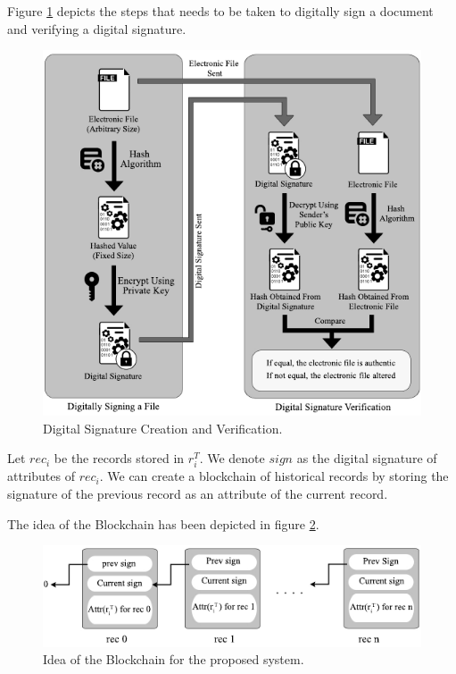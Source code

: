 		Figure \ref{fig:DigitalSignature} depicts the steps that needs to be taken to digitally sign a document and verifying a digital signature.\\
		\begin{figure}
			\centering
			\includegraphics[width=\textwidth]{figs/digital_signature.pdf}
			\caption{Digital Signature Creation and Verification.}
			\label{fig:DigitalSignature}
		\end{figure}
		\begin{defn}[Blockchain] 
			Let $rec_i$ be the records stored in $r_i^T$. We denote $sign$ as the digital signature of attributes of $rec_i$. We can create a blockchain of historical records by storing the signature of the previous record as an attribute of the current record.
		\end{defn}
		The idea of the Blockchain has been depicted in figure \ref{fig:Blockchain}.
		\begin{figure}
			\centering
			\includegraphics[width=\textwidth]{figs/blockchain.pdf}
			\caption{Idea of the Blockchain for the proposed system.}
			\label{fig:Blockchain}
		\end{figure}

